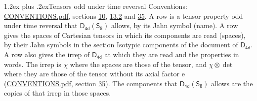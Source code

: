 \documentclass[10pt,a4paper]{article}
\makeatletter
\renewcommand\section{\@startsection{section}{1}{\z@}{-3ex plus -1ex minus -.2ex}%
  {1.2ex plus .2ex}{\normalfont\large\sffamily\bfseries\color{parttitle}}}
\numberwithin{equation}{section}
\newcommand{\grp}[1]{\mathsf{#1}}
\newcommand{\irrprod}{\otimes}
\makeatother
\begin{document}
\section{Tensors odd under time reversal}\label{s:time_odd}
Conventions: \href{../../CONVENTIONS.pdf}{CONVENTIONS.pdf}, sections \href{../../../rotation/CONVENTIONS.pdf\#conv.10}{10}, \href{../../../rotation/CONVENTIONS.pdf\#conv.13.2}{13.2} and \href{../../CONVENTIONS.pdf\#conv.35}{35}.
\leavevmode\label{n:head.name.property}A row is a tensor property odd under time reversal that $\grp{D_{4d}}(\grp{S_{8}})$ allows, by its Jahn symbol (name). \label{n:head.spaces}A row gives the spaces of Cartesian tensors in which its components are read (spaces), by their Jahn symbols in the section Isotypic components of the document of \href{../../../rotation/data/pdf/D4d.pdf}{$\grp{D_{4d}}$}. \label{n:head.properties}A row also gives the irrep of $\grp{D_{4d}}$ at which they are read and the properties in words. The irrep is $\chi$ where the spaces are those of the tensor, and $\chi \irrprod \det$ where they are those of the tensor without its axial factor e (\href{../../CONVENTIONS.pdf}{CONVENTIONS.pdf}, section \href{../../CONVENTIONS.pdf\#conv.35}{35}). The components that $\grp{D_{4d}}(\grp{S_{8}})$ allows are the copies of that irrep in those spaces.
\end{document}

